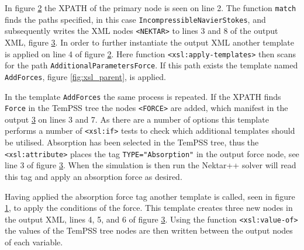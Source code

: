 \documentclass[11pt, a4paper]{report}
\begin{document}
In figure \ref{fig:xsl_final} the XPATH of the primary node is seen on line 2. The function \texttt{match} finds the paths specified, in this case \texttt{IncompressibleNavierStokes}, and subsequently writes the XML nodes \texttt{<NEKTAR>} to lines 3 and 8 of the output XML, figure \ref{fig:xml_output}. In order to further instantiate the output XML another template is applied on line 4 of figure \ref{fig:xsl_final}. Here function \texttt{<xsl:apply-templates>} then scans for the path \texttt{AdditionalParametersForce}. If this path exists the template named \texttt{AddForces}, figure \ref{fig:xsl_parent}, is applied.

In the template \texttt{AddForces} the same process is repeated. If the XPATH finds \texttt{Force} in the TemPSS tree the nodes \texttt{<FORCE>} are added, which manifest in the output \ref{fig:xml_output} on lines 3 and 7. As there are a number of options this template performs a number of \texttt{<xsl:if>} tests to check which additional templates should be utilised. Absorption has been selected in the TemPSS tree, thus the \texttt{<xsl:attribute>} places the tag \texttt{TYPE="Absorption"} in the output force node, see line 3 of figure \ref{fig:xml_output}. When the simulation is then run the Nektar++ solver will read this tag and apply an absorption force as desired.

\begin{figure}[htb!]
 \centering
 
 \label{fig:xsl_child}
\end{figure}

\begin{figure}[htb!]
 \centering
 
 \label{fig:xsl_final}
\end{figure}

Having applied the absorption force tag another template is called, seen in figure \ref{fig:xsl_child}, to apply the conditions of the force. This template creates three new nodes in the output XML, lines 4, 5, and 6 of figure \ref{fig:xml_output}. Using the function \texttt{<xsl:value-of>} the values of the TemPSS tree nodes are then written between the output nodes of each variable.

\begin{figure}[htb!]
 \centering
 
 \label{fig:xml_output}
\end{figure}
\end{document}
